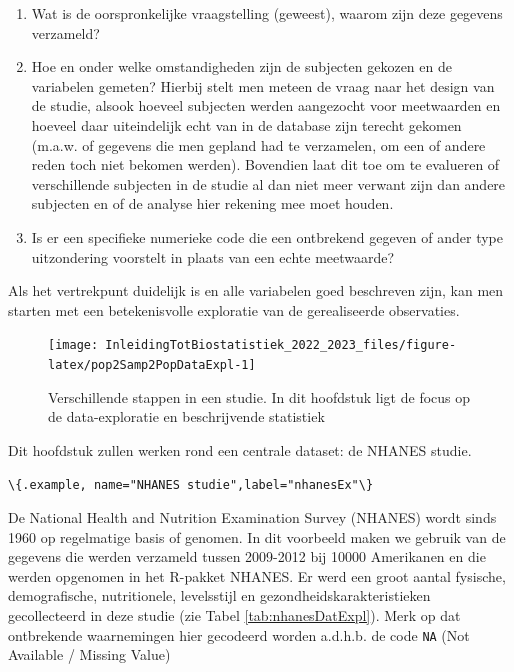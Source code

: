 \documentclass[
  12pt,dutch,coursenotes]{book}
\newcommand{\passthrough}[1]{#1}
\providecommand{\tightlist}{%
  \setlength{\itemsep}{0pt}\setlength{\parskip}{0pt}}
\begin{document}
\begin{enumerate}
\def\labelenumi{\arabic{enumi}.}
\tightlist
\item
  Wat is de oorspronkelijke vraagstelling (geweest), waarom zijn deze
  gegevens verzameld?
\item
  Hoe en onder welke omstandigheden zijn de subjecten gekozen en de variabelen gemeten? Hierbij stelt men meteen de vraag naar het design van de studie, alsook hoeveel subjecten werden aangezocht voor meetwaarden en hoeveel daar uiteindelijk echt van in de database zijn terecht gekomen (m.a.w. of gegevens die men gepland had te verzamelen, om een of andere reden toch niet bekomen werden). Bovendien laat dit toe om te evalueren of verschillende subjecten in de studie al dan niet meer verwant zijn dan andere subjecten en of de analyse hier rekening mee moet houden.
\item
  Is er een specifieke numerieke code die een ontbrekend gegeven of
  ander type uitzondering voorstelt in plaats van een echte meetwaarde?
\end{enumerate}

Als het vertrekpunt duidelijk is en alle variabelen goed beschreven zijn,
kan men starten met een betekenisvolle exploratie van de gerealiseerde
observaties.

\begin{figure}

{\centering \texttt{[image: InleidingTotBiostatistiek\_2022\_2023\_files/figure-latex/pop2Samp2PopDataExpl-1]} 

}

\caption{Verschillende stappen in een studie. In dit hoofdstuk ligt de focus op de data-exploratie en beschrijvende statistiek}\label{fig:pop2Samp2PopDataExpl}
\end{figure}

Dit hoofdstuk zullen werken rond een centrale dataset: de NHANES studie.

\passthrough{\lstinline!\{.example, name="NHANES studie",label="nhanesEx"\}!}

De National Health and Nutrition Examination Survey
(NHANES) wordt sinds 1960 op regelmatige basis of genomen. In dit voorbeeld maken we gebruik van de gegevens die werden verzameld tussen 2009-2012 bij 10000 Amerikanen en die werden opgenomen in het R-pakket NHANES. Er werd een groot aantal fysische, demografische, nutritionele, levelsstijl en gezondheidskarakteristieken gecollecteerd in deze studie (zie Tabel \ref{tab:nhanesDatExpl}). Merk op dat ontbrekende waarnemingen hier gecodeerd worden a.d.h.b. de code \passthrough{\lstinline!NA!} (Not Available / Missing Value)
\end{document}
